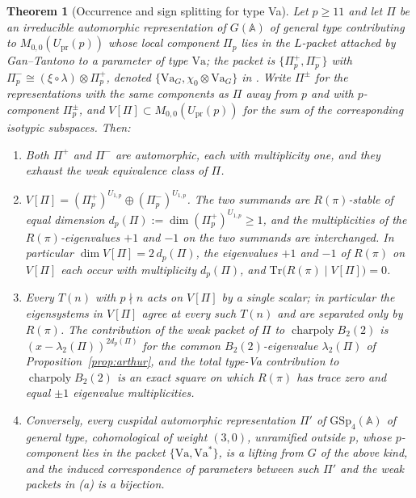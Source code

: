 \documentclass[11pt]{amsart}
\theoremstyle{plain}
\newtheorem{theorem}{Theorem}[section]
\theoremstyle{definition}
\newcommand{\GSp}{\mathrm{GSp}}
\newcommand{\Tr}{\mathrm{Tr}}
\newcommand{\Upr}{U_{\mathrm{pr}}}
\newcommand{\Va}{\mathrm{Va}}
\DeclareMathOperator{\charp}{charpoly}
\providecommand{\Upr}{U_{\mathrm{pr}}}
\providecommand{\Va}{\mathrm{Va}}
\providecommand{\charp}{\operatorname{charpoly}}
\begin{document}
	\begin{theorem}[Occurrence and sign splitting for type Va]
		\label{thm:occurrence}
		Let $p\ge11$ and let $\Pi$ be an irreducible automorphic
		representation of $G(\mathbb{A})$ of general type contributing to
		$M_{0,0}(\Upr(p))$ whose local component $\Pi_p$ lies in the
		$L$-packet attached by Gan--Tantono to a parameter of type $\Va$;
		the packet is $\{\Pi_p^+,\Pi_p^-\}$ with
		$\Pi_p^-\cong(\xi\circ\lambda)\otimes\Pi_p^+$, denoted
		$\{\Va_G,\chi_0\otimes\Va_G\}$ in
		\cite[Table~3]{RoesnerWeissauer2021}. Write $\Pi^{\pm}$ for the
		representations with the same components as $\Pi$ away from $p$ and
		with $p$-component $\Pi_p^{\pm}$, and
		$V[\Pi]\subset M_{0,0}(\Upr(p))$ for the sum of the corresponding
		isotypic subspaces. Then:
		\begin{enumerate}[label=\textup{(\alph*)},leftmargin=2.3em]
			\item Both $\Pi^+$ and $\Pi^-$ are automorphic, each with
			multiplicity one, and they exhaust the weak equivalence class of
			$\Pi$.
			\item $V[\Pi]=(\Pi_p^+)^{U_{1,p}}\oplus(\Pi_p^-)^{U_{1,p}}$. The
			two summands are $R(\pi)$-stable of equal dimension
			$d_p(\Pi):=\dim(\Pi_p^+)^{U_{1,p}}\ge1$, and the multiplicities
			of the $R(\pi)$-eigenvalues $+1$ and $-1$ on the two summands
			are interchanged. In particular $\dim V[\Pi]=2\,d_p(\Pi)$, the
			eigenvalues $+1$ and $-1$ of $R(\pi)$ on $V[\Pi]$ each occur
			with multiplicity $d_p(\Pi)$, and
			$\Tr\bigl(R(\pi)\mid V[\Pi]\bigr)=0$.
			\item Every $T(n)$ with $p\nmid n$ acts on $V[\Pi]$ by a single
			scalar; in particular the eigensystems in $V[\Pi]$ agree at
			every such $T(n)$ and are separated only by $R(\pi)$. The
			contribution of the weak packet of $\Pi$ to $\charp B_2(2)$ is
			$(x-\lambda_2(\Pi))^{2d_p(\Pi)}$ for the common
			$B_2(2)$-eigenvalue $\lambda_2(\Pi)$ of
			Proposition~\ref{prop:arthur}, and the total type-Va
			contribution to $\charp B_2(2)$ is an exact square on which
			$R(\pi)$ has trace zero and equal $\pm1$ eigenvalue
			multiplicities.
			\item Conversely, every cuspidal automorphic representation
			$\Pi'$ of $\GSp_4(\mathbb{A})$ of general type, cohomological of
			weight $(3,0)$, unramified outside $p$, whose $p$-component lies
			in the packet $\{\Va,\Va^{*}\}$, is a lifting from $G$ of the
			above kind, and the induced correspondence of parameters between
			such $\Pi'$ and the weak packets in \textup{(a)} is a bijection.
		\end{enumerate}
	\end{theorem}
	
\end{document}
